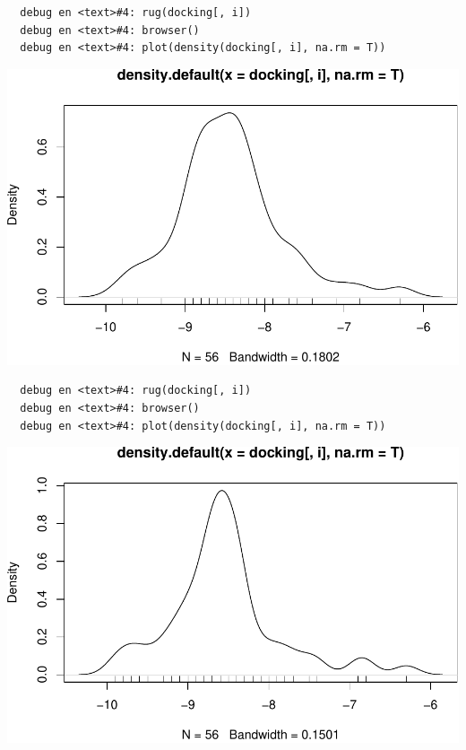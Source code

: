 \documentclass[12pt,twoside]{reedthesis}
\begin{document}
  \begin{verbatim}
  debug en <text>#4: rug(docking[, i])
  debug en <text>#4: browser()
  debug en <text>#4: plot(density(docking[, i], na.rm = T))
  \end{verbatim}
  
  \begin{center}\includegraphics{tesis_files/figure-latex/johan-13} \end{center}
  
  \begin{verbatim}
  debug en <text>#4: rug(docking[, i])
  debug en <text>#4: browser()
  debug en <text>#4: plot(density(docking[, i], na.rm = T))
  \end{verbatim}
  
  \begin{center}\includegraphics{tesis_files/figure-latex/johan-14} \end{center}
  
\end{document}
